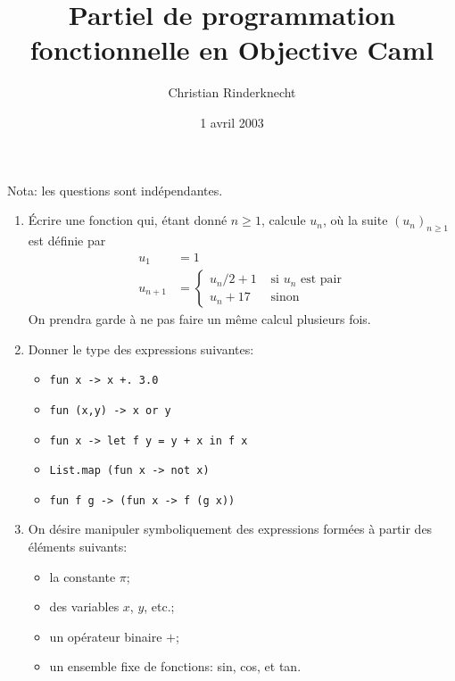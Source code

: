 \documentclass[11pt, a4paper]{article}
\title{Partiel de programmation fonctionnelle en Objective Caml}
\author{Christian Rinderknecht}
\date{1\ier{} avril 2003}
\begin{document}
\maketitle

Nota: les questions sont indépendantes.

\begin{enumerate}

  \item Écrire une fonction qui, étant donné $n\geq 1$, calcule $u_n$,
        où la suite $(u_n)_{n\geq 1}$ est définie par
        \begin{align*}
        u_1 & = 1 \\
        u_{n+1} & = \left\{
                      \begin{array}{ll}
                        u_n/2 + 1 & \text{\ si $u_n$ est pair} \\
                        u_n + 17 & \text{\ sinon}
                      \end{array}
                    \right.
        \end{align*}
        On prendra garde à ne pas faire un même calcul plusieurs fois.

\item Donner le type des expressions suivantes:

      \begin{itemize}
        \item \verb/fun x -> x +. 3.0/
        \item \verb/fun (x,y) -> x or y/
        \item \verb/fun x -> let f y = y + x in f x/
        \item \verb/List.map (fun x -> not x)/
        \item \verb/fun f g -> (fun x -> f (g x))/
      \end{itemize}

\item On désire manipuler symboliquement des expressions formées à
      partir des éléments suivants:

      \begin{itemize}
        \item la constante $\pi$;
        \item des variables $x$, $y$, etc.;
        \item un opérateur binaire $+$;
        \item un ensemble fixe de fonctions: sin, cos, et tan.
      \end{itemize}


\end{enumerate}
\end{document}
